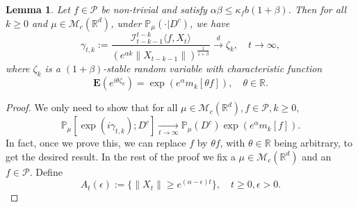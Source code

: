 \documentclass[12pt,a4paper]{amsart}
\theoremstyle{plain}
\newtheorem{lem}[thm]{Lemma}
\theoremstyle{definition}
\numberwithin{equation}{section}
\begin{document}
\begin{lem}\label{lem: mainlemma}
Let $f\in \mathcal{P}$ be non-trivial and satisfy $\alpha\beta\leq \kappa_fb(1+\beta)$.
    Then for all $k\geq 0$ and $\mu \in \mathcal M_c(\mathbb R^d)$, under $\mathbb{P}_{\mu}(\cdot | D ^c)$, we have
\begin{equation}
    \gamma_{t,k}
    :=\frac{\mathcal I_{t-k-1}^{t-k}\langle f ,X_t\rangle}{(e^{\alpha k}\|X_{t-k-1}\|)^{\frac{1}{1+\beta}}}\xrightarrow{d}\zeta_k, \quad t\rightarrow \infty, \label{limitdistribution1}
\end{equation}
    where $\zeta_k$ is a $(1+\beta)$-stable random variable with characteristic function
\[
    \mathbf{E}(e^{i\theta\zeta_k})
    =\exp(e^{\alpha}m_k[\theta f]),\quad \theta \in \mathbb R.
\]
\end{lem}
\begin{proof}
    We only need to show that for all $\mu \in \mathcal M_c(\mathbb R^d), f\in \mathcal P, k \geq 0$,
\begin{equation}
    \mathbb{P}_{\mu}[\exp(i\gamma_{t,k}); D^c]
    \xrightarrow[t\rightarrow \infty]{}\mathbb{P}_{\mu}(D^c)\exp(e^{\alpha}m_k[f]).
\end{equation}
    In fact, once we prove this, we can replace $f$ by $\theta f$, with $\theta \in \mathbb R$ being  arbitrary,  to get the desired result.
    In the rest of the proof we fix a $\mu \in \mathcal M_c(\mathbb R^d)$ and an $f\in \mathcal P$.
    Define
\[
    A_t(\epsilon)
    :=\{ \|X_t\| \geq e^{(\alpha - \epsilon)t} \},
    \quad t\geq 0, \epsilon > 0.
\]


\end{proof}
\end{document}
